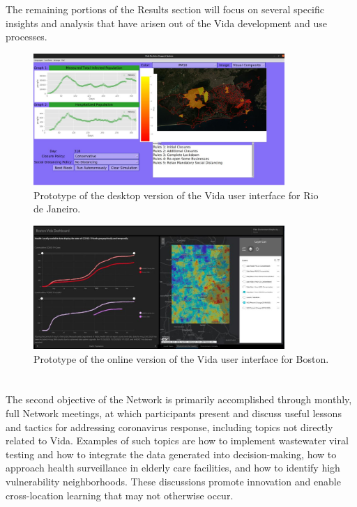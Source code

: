 The remaining portions of the Results section will focus on several specific insights and analysis that have arisen out of the Vida development and use processes.

\begin{figure}[h]
\centering
\includegraphics[width=0.85\textwidth]{Figures/chap5/VidaDesktopScreenshot.jpg}
\caption{Prototype of the desktop version of the Vida user interface for Rio de Janeiro.}
\label{fig:vidad}
\end{figure}

\begin{figure}[h]
\centering
\includegraphics[width=0.85\textwidth]{Figures/chap5/VidaBlueScreenshot.jpg}
\caption{Prototype of the online version of the Vida user interface for Boston.}
\label{fig:vidab}
\end{figure}

\section{} \label{sec:vida-collab}

The second objective of the Network is primarily accomplished through monthly, full Network meetings, at which participants present and discuss useful lessons and tactics for addressing coronavirus response, including topics not directly related to Vida. Examples of such topics are how to implement wastewater viral testing and how to integrate the data generated into decision-making, how to approach health surveillance in elderly care facilities, and how to identify high vulnerability neighborhoods. These discussions promote innovation and enable cross-location learning that may not otherwise occur.

